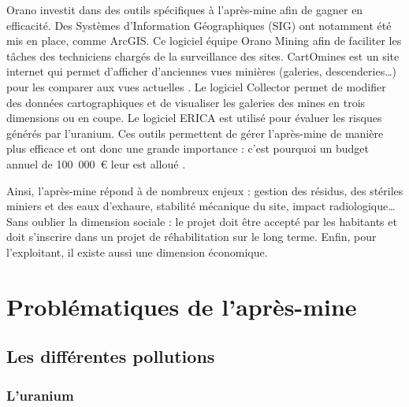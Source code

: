 \documentclass{article}
\begin{document}
Orano investit dans des outils spécifiques à l’après-mine afin de gagner en efficacité. Des Systèmes d’Information Géographiques (SIG) ont notamment été mis en place, comme ArcGIS. Ce logiciel équipe Orano Mining afin de faciliter les tâches des techniciens chargés de la surveillance des sites.
CartOmines est un site internet qui permet d’afficher d’anciennes vues minières (galeries, descenderies…) pour les comparer aux vues actuelles \cite{noauthor_cartomines_nodate}. Le logiciel Collector permet de modifier des données cartographiques et de visualiser les galeries des mines en trois dimensions ou en coupe. Le logiciel ERICA est utilisé pour évaluer les risques générés par l’uranium. Ces outils permettent de gérer l’après-mine de manière plus efficace et ont donc une grande importance : c’est pourquoi un budget annuel de 100~000~\euro{} leur est alloué \cite{gerland_outils_2020}.

Ainsi, l’après-mine répond à de nombreux enjeux : gestion des résidus, des stériles miniers et des eaux d’exhaure, stabilité mécanique du site, impact radiologique… Sans oublier la dimension sociale : le projet doit être accepté par les habitants et doit s’inscrire dans un projet de réhabilitation sur le long terme. Enfin, pour l’exploitant, il existe aussi une dimension économique.

\section{Problématiques de l’après-mine}
\subsection{Les différentes pollutions}
\subsubsection{L'uranium}
\end{document}

